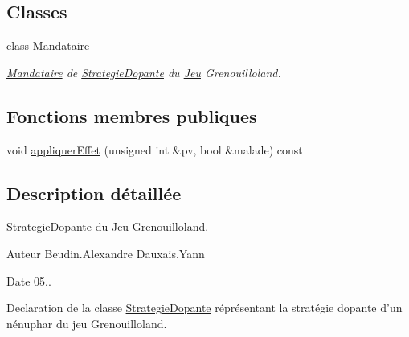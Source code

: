 \subsection*{Classes}
\begin{DoxyCompactItemize}
\item 
class \hyperlink{classgrenouilloland_1_1StrategieDopante_1_1Mandataire}{Mandataire}
\begin{DoxyCompactList}\small\item\em \hyperlink{classgrenouilloland_1_1StrategieDopante_1_1Mandataire}{Mandataire} de \hyperlink{classgrenouilloland_1_1StrategieDopante}{Strategie\-Dopante} du \hyperlink{classgrenouilloland_1_1Jeu}{Jeu} Grenouilloland. \end{DoxyCompactList}\end{DoxyCompactItemize}
\subsection*{Fonctions membres publiques}
\begin{DoxyCompactItemize}
\item 
void \hyperlink{classgrenouilloland_1_1StrategieDopante_a68860bdaf9afa8e4ded568bf56314051}{appliquer\-Effet} (unsigned int \&pv, bool \&malade) const 
\end{DoxyCompactItemize}


\subsection{Description détaillée}
\hyperlink{classgrenouilloland_1_1StrategieDopante}{Strategie\-Dopante} du \hyperlink{classgrenouilloland_1_1Jeu}{Jeu} Grenouilloland. 

\begin{DoxyAuthor}{Auteur}
Beudin.\-Alexandre Dauxais.\-Yann 
\end{DoxyAuthor}
\begin{DoxyDate}{Date}
05..
\end{DoxyDate}
Declaration de la classe \hyperlink{classgrenouilloland_1_1StrategieDopante}{Strategie\-Dopante} réprésentant la stratégie dopante d'un nénuphar du jeu Grenouilloland. 

